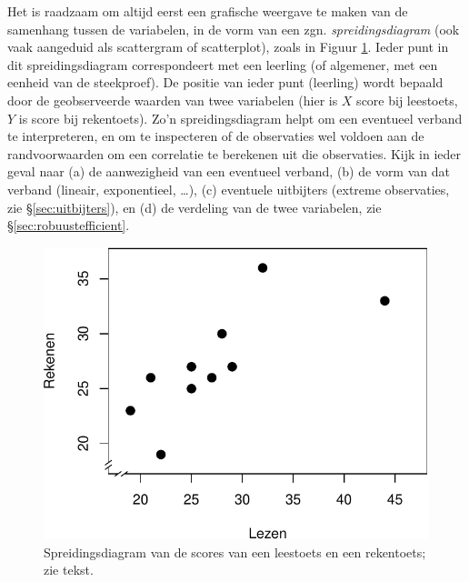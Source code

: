 \documentclass[
]{book}
\begin{document}
Het is raadzaam om altijd eerst een grafische weergave te maken van de
samenhang tussen de variabelen, in de vorm van een zgn.
\emph{spreidingsdiagram} (ook vaak aangeduid als scattergram of scatterplot),
zoals in Figuur \ref{fig:cito-scatter}. Ieder punt in dit spreidingsdiagram
correspondeert met een leerling (of algemener, met een eenheid van de
steekproef). De positie van ieder punt (leerling) wordt bepaald door de
geobserveerde waarden van twee variabelen (hier is \(X\) score bij
leestoets, \(Y\) is score bij rekentoets). Zo'n spreidingsdiagram helpt om
een eventueel verband te interpreteren, en om te inspecteren of de
observaties wel voldoen aan de randvoorwaarden om een correlatie te
berekenen uit die observaties. Kijk in ieder geval naar (a) de
aanwezigheid van een eventueel verband, (b) de vorm van dat verband
(lineair, exponentieel, \ldots), (c) eventuele uitbijters (extreme
observaties, zie §\ref{sec:uitbijters}), en (d) de verdeling van de twee
variabelen, zie §\ref{sec:robuustefficient}.

\begin{figure}

{\centering \includegraphics{KMS-NL_files/figure-latex/cito-scatter-1} 

}

\caption{Spreidingsdiagram van de scores van een leestoets en een rekentoets; zie tekst.}\label{fig:cito-scatter}
\end{figure}
\end{document}
